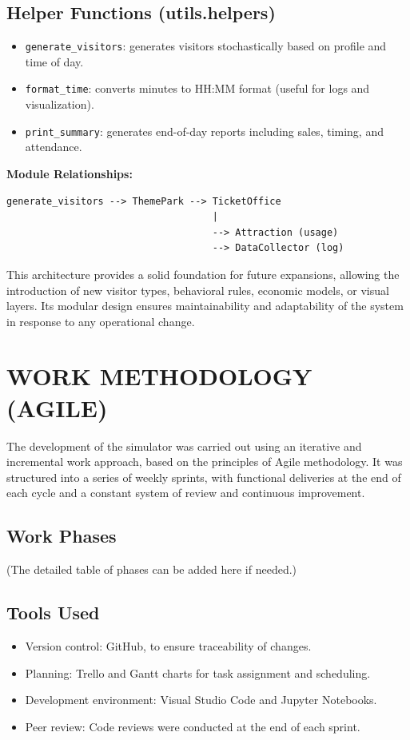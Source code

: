 \documentclass[12pt]{article}
\begin{document}
\subsection{Helper Functions (utils.helpers)}

\begin{itemize}
\item \texttt{generate\_visitors}: generates visitors stochastically based on profile and time of day.
\item \texttt{format\_time}: converts minutes to HH:MM format (useful for logs and visualization).
\item \texttt{print\_summary}: generates end-of-day reports including sales, timing, and attendance.
\end{itemize}

\textbf{Module Relationships:}

\begin{verbatim}
generate_visitors --> ThemePark --> TicketOffice
                                    |
                                    --> Attraction (usage)
                                    --> DataCollector (log)
\end{verbatim}

This architecture provides a solid foundation for future expansions, allowing the introduction of new visitor types, behavioral rules, economic models, or visual layers. Its modular design ensures maintainability and adaptability of the system in response to any operational change.

\section{WORK METHODOLOGY (AGILE)}

The development of the simulator was carried out using an iterative and incremental work approach, based on the principles of Agile methodology. It was structured into a series of weekly sprints, with functional deliveries at the end of each cycle and a constant system of review and continuous improvement.

\subsection{Work Phases}
(The detailed table of phases can be added here if needed.)

\subsection{Tools Used}
\begin{itemize}
\item Version control: GitHub, to ensure traceability of changes.
\item Planning: Trello and Gantt charts for task assignment and scheduling.
\item Development environment: Visual Studio Code and Jupyter Notebooks.
\item Peer review: Code reviews were conducted at the end of each sprint.
\end{itemize}
\end{document}
